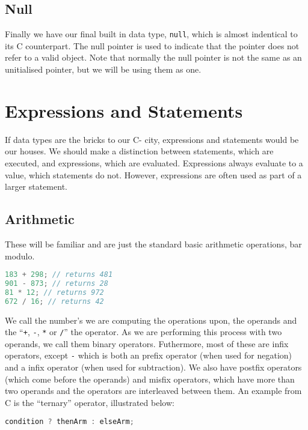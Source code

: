 \subsection{Null}

Finally we have our final built in data type, \verb+null+, which is almost indentical to its C counterpart. The null pointer is used to indicate that the pointer does not refer to a valid object. Note that normally the null pointer is not the same as an unitialised pointer, but we will be using them as one. 

\section{Expressions and Statements}

If data types are the bricks to our C- city, expressions and statements would be our houses. We should make a distinction between statements, which are executed, and expressions, which are evaluated. Expressions always evaluate to a value, which statements do not. However, expressions are often used as part of a larger statement.

\subsection{Arithmetic}

These will be familiar and are just the standard basic arithmetic operations, bar modulo. 

\begin{lstlisting}[language=C]
183 + 298; // returns 481
901 - 873; // returns 28
81 * 12; // returns 972 
672 / 16; // returns 42
\end{lstlisting}

We call the number's we are computing the operations upon, the operands and the ``\verb-+-, \verb+-+, \verb+*+ or \verb+/+'' the operator. As we are performing this process with two operands, we call them binary operators. Futhermore, most of these are infix operators, except \verb+-+ which is both an prefix operator (when used for negation) and a infix operator (when used for subtraction). We also have postfix operators (which come before the operands) and misfix operators, which have more than two operands and the operators are interleaved between them. An example from C is the ``ternary'' operator, illustrated below:

\begin{lstlisting}[language=C]
condition ? thenArm : elseArm;
\end{lstlisting}

